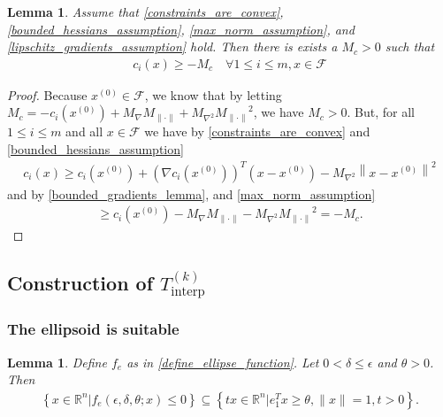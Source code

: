 \documentclass{article}
\newtheorem{lemma}[theorem]{Lemma}
\theoremstyle{case}
\newcommand{\feasible}{{\mathcal F}}
\newcommand{\maxgrad}{{M_{\nabla}}}
\newcommand{\maxhessian}{{M_{\nabla^2}}}
\newcommand{\maxnorm}{{M_{\|\cdot\|}}}
\newcommand{\Rn}{\mathbb R^n}
\newcommand{\sampletrk}{{T_{\text{interp}}^{(k)}}}
\begin{document}
\begin{lemma}
\label{maximum_constraint_value_lemma}
Assume that \cref{constraints_are_convex}, \cref{bounded_hessians_assumption}, \cref{max_norm_assumption}, and \cref{lipschitz_gradients_assumption} hold.
Then there is exists a $M_c>0$ such that
\begin{align*}
c_i(x) \ge -M_c \quad \forall 1\le i \le m, x \in \feasible
\end{align*}
\end{lemma}
\begin{proof}
Because $x^{(0)} \in\feasible$, we know that
by letting $M_c = -c_i(x^{(0)}) + \maxgrad\maxnorm + \maxhessian \maxnorm^2$, we have $M_c > 0$.
But, for all $1 \le i \le m$ and all $x \in \feasible$ we have by 
\cref{constraints_are_convex} and \cref{bounded_hessians_assumption}
\begin{align*}
c_i(x) \ge c_i(x^{(0)}) + \left(\nabla c_i(x^{(0)})\right)^T\left(x - x^{(0)}\right) - \maxhessian \left\|x - x^{(0)}\right\|^2
\end{align*}
and by \cref{bounded_gradients_lemma}, and \cref{max_norm_assumption}
\begin{align*}
\ge c_i(x^{(0)}) - \maxgrad\maxnorm - \maxhessian \maxnorm^2 = -M_c.
\end{align*}
\end{proof}


\subsection{Construction of $\sampletrk$}
\label{feasible_ellipsoid_analysis}


\subsubsection{The ellipsoid is suitable}

\begin{lemma}
\label{ellipse_in_cone}
Define $f_e$ as in \cref{define_ellipse_function}.
Let $0 < \delta \le \epsilon$ and $\theta > 0$.
Then 
\begin{align*}
\left\{x \in \Rn | f_e(\epsilon, \delta, \theta; x) \le 0\right\} \subseteq \left\{tx\in\Rn| e_1^T x \ge \theta,\|x\|=1, t>0\right\}.
\end{align*}
\end{lemma}
\end{document}
